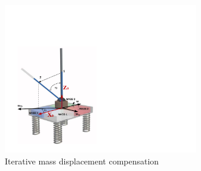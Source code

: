 \begin{figure}
	\centering
	\includegraphics[width=85mm]{./pictures/IterativeAlgorithm.pdf}
	\caption{Iterative mass displacement compensation}
	\label{fig:imassCom}
\end{figure}